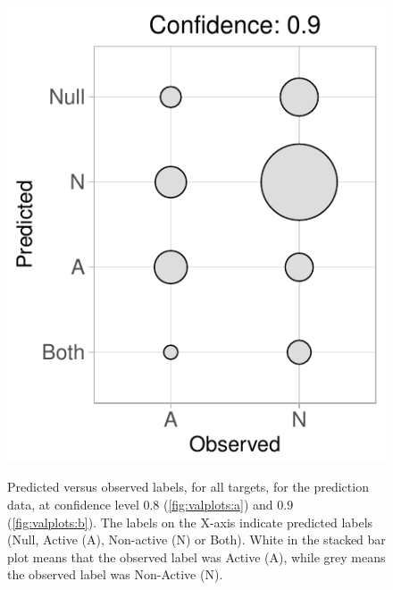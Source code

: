 \documentclass[utf8]{frontiersSCNS} %
\begin{document}
\begin{figure}[h!]
\begin{minipage}[c]{0.38\textwidth}
{        \includegraphics[width=1\textwidth]{figures/validation_plots/alltargets_0p9_valplot.pdf}
    }\label{fig:valplots:b}
\end{minipage}
    \caption{Predicted versus observed labels, for all targets, for the prediction data,
    at confidence level 0.8 (\ref{fig:valplots:a}) and 0.9
    (\ref{fig:valplots:b}).  The labels on the X-axis indicate predicted labels
    (Null, Active (A), Non-active (N) or Both). White in the stacked bar plot
    means that the observed label was Active (A), while grey means the observed
    label was Non-Active (N).
    }
    \label{fig:valplots}
\end{figure}
\end{document}
